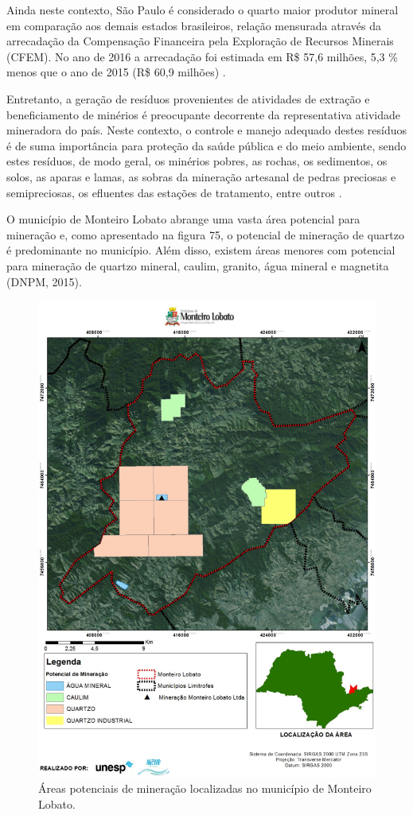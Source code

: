 	
	Ainda neste contexto, São Paulo é considerado o quarto maior produtor mineral em comparação aos demais estados brasileiros, relação mensurada através da arrecadação da Compensação Financeira pela Exploração de Recursos Minerais (CFEM). No ano de 2016 a arrecadação foi estimada em R\$ 57,6 milhões, 5,3 \% menos que o ano de 2015 (R\$ 60,9 milhões) \cite{informe2016}.

	Entretanto, a geração de resíduos provenientes de atividades de extração e beneficiamento de minérios é preocupante decorrente da representativa atividade mineradora do país. Neste contexto, o controle e manejo adequado destes resíduos é de suma importância para proteção da saúde pública e do meio ambiente, sendo estes resíduos, de modo geral, os minérios pobres, as rochas, os sedimentos, os solos, as aparas e lamas, as sobras da mineração artesanal de pedras preciosas e semipreciosas, os efluentes das estações de tratamento, entre outros \cite{IBRAM2016}. 
	
	O município de Monteiro Lobato abrange uma vasta área potencial para mineração e, como apresentado na figura 75, o potencial de mineração de quartzo é predominante no município. Além disso, existem áreas menores com potencial para mineração de quartzo mineral, caulim, granito, água mineral e magnetita (DNPM, 2015).
	
	\begin{figure}
		\centering
		\includegraphics[width=0.75\linewidth]{produtos/prodtres/image091}
		\caption{Áreas potenciais de mineração localizadas no município de Monteiro Lobato.}
		\label{fig:image091}
	\end{figure}
	


